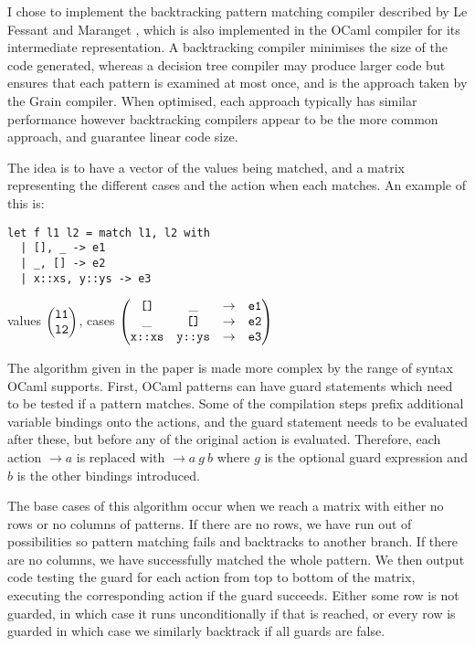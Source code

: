 I chose to implement the backtracking pattern matching compiler described by Le Fessant and Maranget \cite{ocamlpatternmatch}, which is also implemented in the OCaml compiler for its intermediate representation. A backtracking compiler minimises the size of the code generated, whereas a decision tree compiler may produce larger code but ensures that each pattern is examined at most once, and is the approach taken by the Grain compiler. When optimised, each approach typically has similar performance \cite{decisiontrees} however backtracking compilers appear to be the more common approach, and guarantee linear code size.


The idea is to have a vector of the values being matched, and a matrix representing the different cases and the action when each matches. An example of this is:

\begin{minipage}{0.45\textwidth}
\begin{verbatim}
let f l1 l2 = match l1, l2 with
  | [], _ -> e1
  | _, [] -> e2
  | x::xs, y::ys -> e3
\end{verbatim}
\end{minipage}
\begin{minipage}{0.55\textwidth}
 values $\begin{pmatrix}
\verb|l1| \\
\verb|l2|
\end{pmatrix}$, cases
$\begin{pmatrix}
\verb|[]| & \_ & \to & \verb|e1| \\
\_ & \verb|[]| & \to & \verb|e2| \\
\verb|x::xs| & \verb|y::ys| & \to & \verb|e3| \\
\end{pmatrix}$
\end{minipage}

The algorithm given in the paper is made more complex by the range of syntax OCaml supports. %
First, OCaml patterns can have guard statements which need to be tested if a pattern matches. Some of the compilation steps prefix additional variable bindings onto the actions, and the guard statement needs to be evaluated after these, but before any of the original action is evaluated. Therefore, each action $\to a$ is replaced with $\to a \ g \ b$ where $g$ is the optional guard expression and $b$ is the other bindings introduced.

The base cases of this algorithm occur when we reach a matrix with either no rows or no columns of patterns. If there are no rows, we have run out of possibilities so pattern matching fails and backtracks to another branch. If there are no columns, we have successfully matched the whole pattern. We then output code testing the guard for each action from top to bottom of the matrix, executing the corresponding action if the guard succeeds. Either some row is not guarded, in which case it runs unconditionally if that is reached, or every row is guarded in which case we similarly backtrack if all guards are false.

